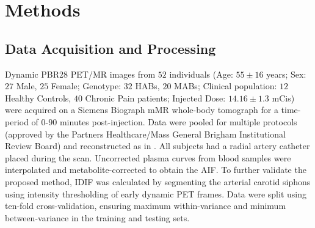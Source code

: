 \vspace{-0.5cm}

\section{Methods} \label{sec:methods}     
    \subsection{Data Acquisition and Processing}\label{sec:dataproc}
        Dynamic \gls{PBR28} \gls{PET}/\gls{MR} images from $52$ individuals (Age: $55 \pm 16$ years; Sex: $27$ Male, $25$ Female; Genotype: $32$ \glspl{HAB}, $20$ \glspl{MAB}; Clinical population: $12$ Healthy Controls, $40$ Chronic Pain patients; Injected Dose: $14.16 \pm 1.3$ \glspl{mCi}) were acquired on a Siemens Biograph mMR whole-body tomograph for a time-period of $0$-$90$ minutes post-injection. Data were pooled for multiple protocols (approved by the Partners Healthcare/Mass General Brigham Institutional Review Board) and reconstructed as in \cite{Brusaferri2022ThePandemic}. All subjects had a radial artery catheter placed during the scan. Uncorrected plasma curves from blood samples were interpolated and metabolite-corrected to obtain the \gls{AIF}. To further validate the proposed method, \gls{IDIF} was calculated by segmenting the arterial carotid siphons using intensity thresholding of early dynamic \gls{PET} frames. Data were split using ten-fold cross-validation, ensuring maximum within-variance and minimum between-variance in the training and testing sets.
        
        

